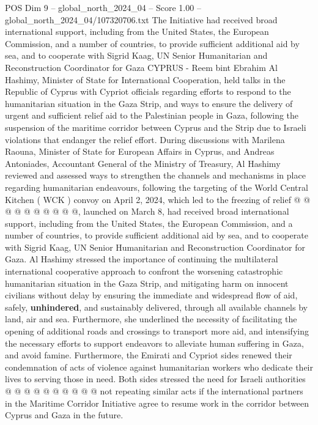 \begin{textsample}{POS Dim 9 – global\_north\_2024\_04 – Score 1.00 – global\_north\_2024\_04/107320706.txt}  \label{ex:f9_pos_231}
The Initiative had received broad international support, including from the United States, the European Commission, and a number of countries, to provide sufficient additional aid by sea, and to cooperate with Sigrid Kaag, UN Senior Humanitarian and Reconstruction Coordinator for Gaza CYPRUS - Reem bint Ebrahim Al Hashimy, Minister of State for International Cooperation, held talks in the Republic of Cyprus with Cypriot officials regarding efforts to respond to the humanitarian situation in the Gaza Strip, and ways to ensure the delivery of urgent and sufficient relief aid to the Palestinian people in Gaza, following the suspension of the maritime corridor between Cyprus and the Strip due to Israeli violations that endanger the relief effort.
During discussions with Marilena Raouna, Minister of State for European Affairs in Cyprus, and Andreas Antoniades, Accountant General of the Ministry of Treasury, Al Hashimy reviewed and assessed ways to strengthen the channels and mechanisms in place regarding humanitarian endeavours, following the targeting of the World Central Kitchen ( WCK ) convoy on April 2, 2024, which led to the freezing of relief @ @ @ @ @ @ @ @ @ @, launched on March 8, had received broad international support, including from the United States, the European Commission, and a number of countries, to provide sufficient additional aid by sea, and to cooperate with Sigrid Kaag, UN Senior Humanitarian and Reconstruction Coordinator for Gaza.
Al Hashimy stressed the importance of continuing the multilateral international cooperative approach to confront the worsening catastrophic humanitarian situation in the Gaza Strip, and mitigating harm on innocent civilians without delay by ensuring the immediate and widespread flow of aid, safely, \textbf{unhindered}, and sustainably delivered, through all available channels by land, air and sea.
Furthermore, she underlined the necessity of facilitating the opening of additional roads and crossings to transport more aid, and intensifying the necessary efforts to support endeavors to alleviate human suffering in Gaza, and avoid famine.
Furthermore, the Emirati and Cypriot sides renewed their condemnation of acts of violence against humanitarian workers who dedicate their lives to serving those in need.
Both sides stressed the need for Israeli authorities @ @ @ @ @ @ @ @ @ @ not repeating similar acts if the international partners in the Maritime Corridor Initiative agree to resume work in the corridor between Cyprus and Gaza in the future.

\end{textsample}
